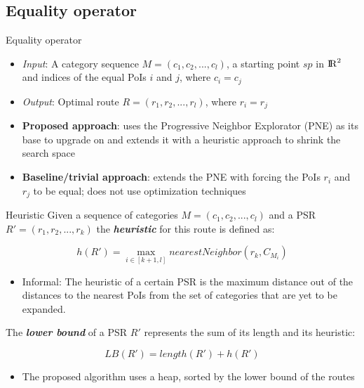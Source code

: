 \documentclass[18pt]{beamer}
\begin{document}
	\subsection{Equality operator}
		\begin{frame}{Equality operator}
			
			\begin{itemize}
				\item \textit{Input}: A category sequence $M = (c_1, c_2, ..., c_l)$, a starting point $sp$ in ${\rm I\!R}^2$ and indices of the equal PoIs $i$ and $j$, where $c_i = c_j$
				\item \textit{Output}: Optimal route $R = (r_1, r_2, ..., r_l)$, where $r_i = r_j$ \newline
				\item \textbf{Proposed approach}: uses the Progressive Neighbor Explorator (PNE) as its base to upgrade on and extends it with a heuristic approach to shrink the search space
				\item \textbf{Baseline/trivial approach}: extends the PNE with forcing the PoIs $r_i$ and $r_j$ to be equal; does not use optimization techniques
			\end{itemize}
			
		\end{frame}
	
		\begin{frame}{Heuristic}
			Given a sequence of categories $M = (c_1, c_2, ..., c_l)$ and a PSR $R' = (r_1, r_2, ..., r_k)$ the \textbf{\textit{heuristic}} for this route is defined as: 
			
			\begin{equation}
			h(R') = \max_{i \in [k+1, l]} nearestNeighbor(r_k, C_{M_{i}})
			\end{equation}
			
			\begin{itemize}
				\item Informal: The heuristic of a certain PSR is the maximum distance out of the distances to the nearest PoIs from the set of categories that are yet to be expanded. 
			\end{itemize}
			\pause
			The \textbf{\textit{lower bound}} of a PSR $R'$ represents the sum of its length and its heuristic:
			
			\begin{equation}
			LB(R') = length(R') + h(R')
			\end{equation}
			
			\begin{itemize}
				\item The proposed algorithm uses a heap, sorted by the lower bound of the routes
			\end{itemize}
		\end{frame}
	
\end{document}
